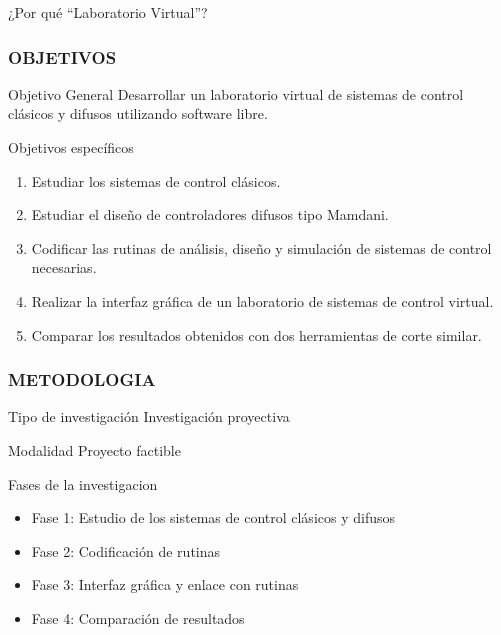 \documentclass[usenames,dvipsnames]{beamer}
\begin{document}
\begin{frame}
\begin{block}{¿Por qué ``Laboratorio Virtual''?}
\begin{figure}
			\end{figure}
	\end{block}
\end{frame}

\begin{frame}
	\frametitle{OBJETIVOS}
	\vspace{20pt}
	\begin{block}{Objetivo General}
		Desarrollar un laboratorio virtual de sistemas de control clásicos y difusos utilizando software libre.
	\end{block}
	
	\begin{block}{Objetivos específicos}
		\begin{enumerate} 
			\item Estudiar los sistemas de control clásicos.
			\item Estudiar el diseño de controladores difusos tipo Mamdani.
			\item Codificar las rutinas de análisis, diseño y simulación de sistemas de control necesarias.
			\item Realizar la interfaz gráfica de un laboratorio de sistemas de control virtual.
			\item Comparar los resultados obtenidos con dos herramientas de corte similar.
		\end{enumerate}
	\end{block}
	
\end{frame}

\begin{frame}
	\frametitle{METODOLOGIA}

	\vspace{20pt}
	
	\begin{block}{Tipo de investigación}
		Investigación proyectiva
	\end{block}

	\begin{block}{Modalidad}
		Proyecto factible
	\end{block}

	\begin{block}{Fases de la investigacion}
		\begin{itemize}
			\item Fase 1: Estudio de los sistemas de control clásicos y difusos
			\item Fase 2: Codificación de rutinas
			\item Fase 3: Interfaz gráfica y enlace con rutinas
			\item Fase 4: Comparación de resultados
		\end{itemize}
	\end{block}	
\end{frame}
\end{document}

